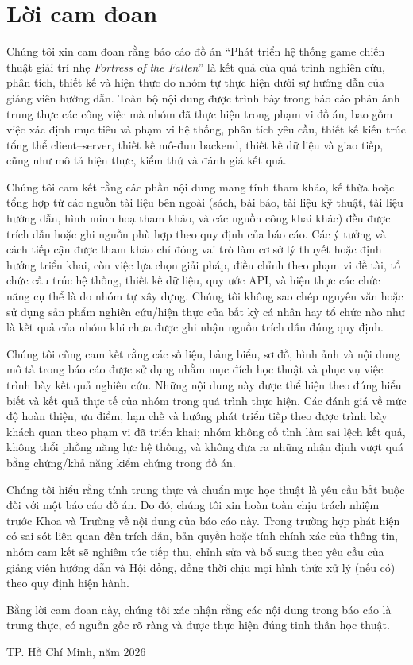 ﻿%
\section*{Lời cam đoan}

Chúng tôi xin cam đoan rằng báo cáo đồ án ``Phát triển hệ thống game chiến thuật giải trí nhẹ \textit{Fortress of the Fallen}'' là kết quả của quá trình nghiên cứu, phân tích, thiết kế và hiện thực do nhóm tự thực hiện dưới sự hướng dẫn của giảng viên hướng dẫn. Toàn bộ nội dung được trình bày trong báo cáo phản ánh trung thực các công việc mà nhóm đã thực hiện trong phạm vi đồ án, bao gồm việc xác định mục tiêu và phạm vi hệ thống, phân tích yêu cầu, thiết kế kiến trúc tổng thể client--server, thiết kế mô-đun backend, thiết kế dữ liệu và giao tiếp, cũng như mô tả hiện thực, kiểm thử và đánh giá kết quả.

Chúng tôi cam kết rằng các phần nội dung mang tính tham khảo, kế thừa hoặc tổng hợp từ các nguồn tài liệu bên ngoài (sách, bài báo, tài liệu kỹ thuật, tài liệu hướng dẫn, hình minh hoạ tham khảo, và các nguồn công khai khác) đều được trích dẫn hoặc ghi nguồn phù hợp theo quy định của báo cáo. Các ý tưởng và cách tiếp cận được tham khảo chỉ đóng vai trò làm cơ sở lý thuyết hoặc định hướng triển khai, còn việc lựa chọn giải pháp, điều chỉnh theo phạm vi đề tài, tổ chức cấu trúc hệ thống, thiết kế dữ liệu, quy ước API, và hiện thực các chức năng cụ thể là do nhóm tự xây dựng. Chúng tôi không sao chép nguyên văn hoặc sử dụng sản phẩm nghiên cứu/hiện thực của bất kỳ cá nhân hay tổ chức nào như là kết quả của nhóm khi chưa được ghi nhận nguồn trích dẫn đúng quy định.

Chúng tôi cũng cam kết rằng các số liệu, bảng biểu, sơ đồ, hình ảnh và nội dung mô tả trong báo cáo được sử dụng nhằm mục đích học thuật và phục vụ việc trình bày kết quả nghiên cứu. Những nội dung này được thể hiện theo đúng hiểu biết và kết quả thực tế của nhóm trong quá trình thực hiện. Các đánh giá về mức độ hoàn thiện, ưu điểm, hạn chế và hướng phát triển tiếp theo được trình bày khách quan theo phạm vi đã triển khai; nhóm không cố tình làm sai lệch kết quả, không thổi phồng năng lực hệ thống, và không đưa ra những nhận định vượt quá bằng chứng/khả năng kiểm chứng trong đồ án.

Chúng tôi hiểu rằng tính trung thực và chuẩn mực học thuật là yêu cầu bắt buộc đối với một báo cáo đồ án. Do đó, chúng tôi xin hoàn toàn chịu trách nhiệm trước Khoa và Trường về nội dung của báo cáo này. Trong trường hợp phát hiện có sai sót liên quan đến trích dẫn, bản quyền hoặc tính chính xác của thông tin, nhóm cam kết sẽ nghiêm túc tiếp thu, chỉnh sửa và bổ sung theo yêu cầu của giảng viên hướng dẫn và Hội đồng, đồng thời chịu mọi hình thức xử lý (nếu có) theo quy định hiện hành.

Bằng lời cam đoan này, chúng tôi xác nhận rằng các nội dung trong báo cáo là trung thực, có nguồn gốc rõ ràng và được thực hiện đúng tinh thần học thuật.

\vspace{1.0cm}
\begin{flushright}
TP. Hồ Chí Minh, năm 2026
\end{flushright}

